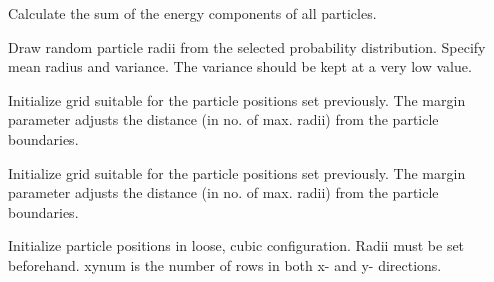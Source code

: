 \documentclass[letterpaper,10pt,english]{sphinxmanual}
\begin{document}
\begin{fulllineitems}
\begin{fulllineitems}
\end{fulllineitems}


\begin{fulllineitems}
\label{python_api:sphere.Spherebin.energy}
Calculate the sum of the energy components of all particles.

\end{fulllineitems}


\begin{fulllineitems}
\label{python_api:sphere.Spherebin.generateRadii}
Draw random particle radii from the selected probability distribution.
Specify mean radius and variance. The variance should be kept at a
very low value.

\end{fulllineitems}


\begin{fulllineitems}
\label{python_api:sphere.Spherebin.initGrid}
Initialize grid suitable for the particle positions set previously.
The margin parameter adjusts the distance (in no. of max. radii)
from the particle boundaries.

\end{fulllineitems}


\begin{fulllineitems}
\label{python_api:sphere.Spherebin.initGridAndWorldsize}
Initialize grid suitable for the particle positions set previously.
The margin parameter adjusts the distance (in no. of max. radii)
from the particle boundaries.

\end{fulllineitems}


\begin{fulllineitems}
\label{python_api:sphere.Spherebin.initGridPos}
Initialize particle positions in loose, cubic configuration.
Radii must be set beforehand.
xynum is the number of rows in both x- and y- directions.


\end{fulllineitems}
\end{fulllineitems}
\end{document}
